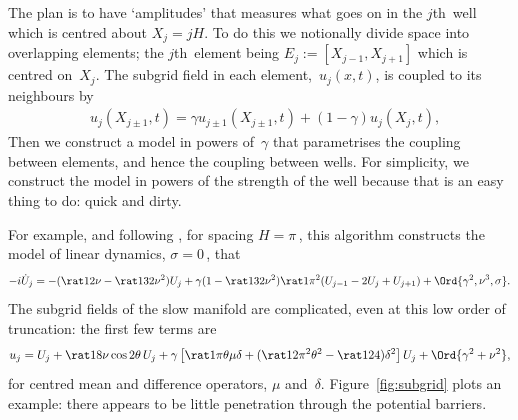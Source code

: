 \documentclass[12pt,a5paper]{article}
\newcommand{\ajr}[1]{%
  \pdfcomment[author=AJR,color={1 1 0},subject={#1}]{#1}}
\begin{document}
The plan is to have `amplitudes' that measures what goes on in the \(j\)th~well which is centred about \(X_j=jH\).
To do this we notionally divide space into overlapping elements; the \(j\)th~element being \(E_j:=[X_{j-1},X_{j+1}]\) which is centred on~\(X_j\).
The subgrid field in each element,~\(u_j(x,t)\), is coupled to its neighbours by  \ajr{No it is not!!!}
\begin{align}&
u_j(X_{j\pm1},t)=\gamma u_{j\pm1}(X_{j\pm1},t)
+(1-\gamma)u_j(X_j,t),
\label{eq:cc}
\end{align}
Then we construct a model in powers of~\(\gamma\) that parametrises the coupling between elements, and hence the coupling between wells.
For simplicity, we construct the model in powers of the strength of the well because that is an easy thing to do: quick and dirty.


For example, and following \cite{Alfimov2002}, for spacing \(H=\pi\)\,, this algorithm constructs the model of linear dynamics, \(\sigma=0\)\,, that
\begin{equation}
-i\dot U_j=-(\rat12\nu-\rat1{32}\nu^2)U_j
+\gamma(1-\rat1{32}\nu^2)\rat1{\pi^2}(U_{j-1}-2U_j+U_{j+1})
+\Ord{\gamma^2,\nu^3,\sigma}.
\label{eq:igj}
\end{equation}
The subgrid fields of the slow manifold are complicated, even at this low order of truncation: the first few terms are
\begin{equation}
u_j = U_j +\rat18\nu\cos2\theta\,U_j
+\gamma\left[\rat1\pi\theta\mu\delta+(\rat1{2\pi^2}\theta^2-\rat1{24})\delta^2\right]U_j
+\Ord{\gamma^2+\nu^2},
\label{eq:uj}
\end{equation}
for centred mean and difference operators, \(\mu\) and~\(\delta\).
Figure~\ref{fig:subgrid} plots an example: 
there appears to be little penetration through the potential barriers.
\end{document}
